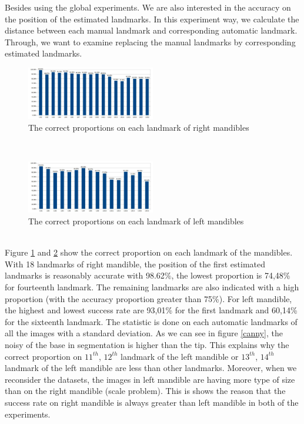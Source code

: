 \documentclass[twoside,twocolumn,10pt]{article}
\begin{document}
Besides using the global experiments. We are also
interested in the accuracy on the position of the estimated landmarks. In this experiment
way, we calculate the distance between each manual landmark and
corresponding automatic landmark. Through, we want to examine replacing the manual landmarks by corresponding estimated landmarks.
\begin{figure}[htb]
    \centering
    \includegraphics[width=0.5\textwidth]{./images/md_chartlms}
    \caption{The correct proportions on each landmark of right mandibles }
    \label{figmdresultlm}
\end{figure}~\\
\begin{figure}[htb]
    \centering
    \includegraphics[width=0.5\textwidth]{./images/mg_chartlms}
    \caption{The correct proportions on each landmark of left mandibles }
    \label{figmgresultlm}
\end{figure}~\\
Figure \ref{figmdresultlm} and \ref{figmgresultlm} show the correct proportion on each landmark of the mandibles. With 18 landmarks of right mandible, the position of the first estimated landmarks is reasonably accurate with 98.62\%, the lowest proportion is 74,48\% for fourteenth landmark. The remaining landmarks are also indicated with a high proportion (with the accuracy proportion greater than 75\%). For left mandible, the highest and lowest success rate are 93,01\% for the first landmark and 60,14\% for the sixteenth landmark. The statistic is done on each automatic landmarks of all the images with a standard deviation\cite{bland1996statistics}. As we can see in figure \ref{canny}, the noisy of the base in segmentation is higher than the tip. This explains why the correct proportion on $11^{th}$, $12^{th}$ landmark of the left mandible or $13^{th}$, $14^{th}$ landmark of the left mandible are less than other landmarks. Moreover, when we reconsider the datasets, the images in left mandible are having more type of size than on the right mandible (scale problem). This is shows the reason that the success rate on right mandible is always greater than left mandible in both of the experiments.\\
\end{document}
